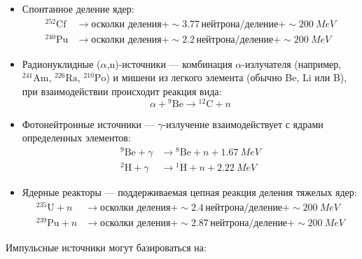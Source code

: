 \documentclass[a4paper]{article}
\begin{document}
\begin{itemize}
    \item Спонтанное деление ядер:
    \begin{align*}
        ^{252}\text{Cf} &\to \text{осколки деления} + \sim3.77\,\text{нейтрона/деление} + \sim\SI{200}{MeV} \\
        ^{240}\text{Pu} &\to \text{осколки деления} + \sim2.2\,\text{нейтрона/деление} + \sim\SI{200}{MeV}
    \end{align*}
    
    \item Радионуклидные ($\alpha$,n)-источники --- комбинация $\alpha$-излучателя (например, \(^{241}\text{Am}\), \(^{226}\text{Ra}\), \(^{210}\text{Po}\)) и мишени из легкого элемента (обычно Be, Li или B), при взаимодействии происходит реакция вида:
    \[
    \alpha + {}^9\text{Be} \to {}^{12}\text{C} + n
    \]
    
    \item Фотонейтронные источники --- $\gamma$-излучение взаимодействует с ядрами определенных элементов:
    \begin{align*}
        ^9\text{Be} + \gamma &\to {}^8\text{Be} + n + \SI{1.67}{MeV} \\
        ^2\text{H} + \gamma &\to {}^1\text{H} + n + \SI{2.22}{MeV}
    \end{align*}
    
    \item Ядерные реакторы --- поддерживаемая цепная реакция деления тяжелых ядер:
    \begin{align*}
        ^{235}\text{U} + n &\to \text{осколки деления} + \sim2.4\,\text{нейтрона/деление} + \sim\SI{200}{MeV} \\
        ^{239}\text{Pu} + n &\to \text{осколки деления} + \sim2.87\,\text{нейтрона/деление} + \sim\SI{200}{MeV}
    \end{align*}
\end{itemize}

Импульсные источники могут базироваться на:
\end{document}

